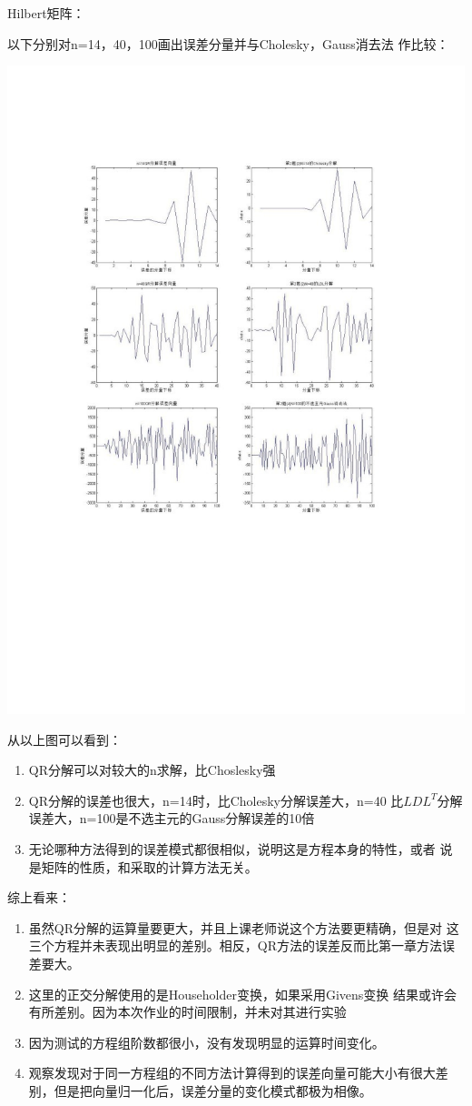 \documentclass{ctexart}
\begin{document}
\begin{itemize}
Hilbert矩阵：

以下分别对n=14，40，100画出误差分量并与Cholesky，Gauss消去法
作比较：
\par
\centerline{\includegraphics{3.jpg}}
\par
从以上图可以看到：
\begin{enumerate}
\item
QR分解可以对较大的n求解，比Choslesky强
\item
QR分解的误差也很大，n=14时，比Cholesky分解误差大，n=40
比$LDL^T$分解误差大，n=100是不选主元的Gauss分解误差的10倍
\item
无论哪种方法得到的误差模式都很相似，说明这是方程本身的特性，或者
说是矩阵的性质，和采取的计算方法无关。
\end{enumerate}
\end{itemize}
综上看来：
\begin{enumerate}
\item
虽然QR分解的运算量要更大，并且上课老师说这个方法要更精确，但是对
这三个方程并未表现出明显的差别。相反，QR方法的误差反而比第一章方法误差要大。
\item
这里的正交分解使用的是Householder变换，如果采用Givens变换
结果或许会有所差别。因为本次作业的时间限制，并未对其进行实验
\item
因为测试的方程组阶数都很小，没有发现明显的运算时间变化。
\item
观察发现对于同一方程组的不同方法计算得到的误差向量可能大小有很大差别，但是把向量归一化后，误差分量的变化模式都极为相像。
\end{enumerate}
\end{document}
